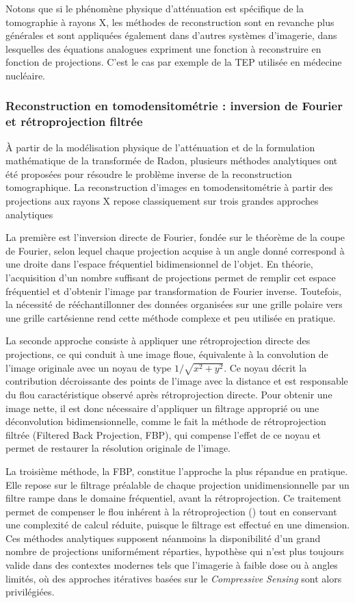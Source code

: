 Notons que si le phénomène physique d'atténuation est spécifique de la tomographie à rayons X, les méthodes de reconstruction sont en revanche plus générales et sont appliquées également dans d'autres systèmes d'imagerie, dans lesquelles des équations analogues expriment une fonction à reconstruire en fonction de projections. C'est le cas par exemple de la TEP utilisée en médecine nucléaire.

\subsubsection{Reconstruction en tomodensitométrie : inversion de Fourier et rétroprojection filtrée}
À partir de la modélisation physique de l'atténuation et de la formulation mathématique de la
transformée de Radon, plusieurs méthodes analytiques ont été proposées pour résoudre le
problème inverse de la reconstruction tomographique.
La reconstruction d'images en tomodensitométrie à partir des projections aux rayons X repose
classiquement sur trois grandes approches analytiques 

La première est l'inversion directe de Fourier, fondée sur le théorème de la coupe de Fourier, selon lequel chaque projection acquise à
un angle donné correspond à une droite dans l'espace fréquentiel bidimensionnel de l'objet.
En théorie, l'acquisition d'un nombre suffisant de projections permet de remplir cet espace
fréquentiel et d'obtenir l'image par transformation de Fourier inverse. Toutefois, la nécessité
de rééchantillonner des données organisées sur une grille polaire vers une grille cartésienne
rend cette méthode complexe et peu utilisée en pratique. 

La seconde approche consiste à appliquer une rétroprojection directe des projections, ce qui conduit à une image floue,
équivalente à la convolution de l'image originale avec un noyau de type
$1/\sqrt{x^2+y^2}$. Ce noyau décrit la contribution décroissante des points de l'image avec la distance et est responsable du flou caractéristique observé après rétroprojection directe. Pour obtenir une image nette, il est donc nécessaire d'appliquer un filtrage approprié ou une déconvolution bidimensionnelle, comme le fait la méthode de rétroprojection filtrée (Filtered Back Projection, FBP), qui compense l'effet de ce noyau et permet de restaurer la résolution originale de l'image. 

La troisième méthode, la FBP, constitue l'approche la plus répandue en pratique. Elle repose sur le
filtrage préalable de chaque projection unidimensionnelle par un filtre rampe dans le domaine
fréquentiel, avant la rétroprojection. Ce traitement permet de compenser le flou inhérent à la
rétroprojection (\cite{9}) tout en conservant une complexité de calcul réduite, puisque le filtrage est
effectué en une dimension. Ces méthodes analytiques supposent néanmoins la disponibilité d'un
grand nombre de projections uniformément réparties, hypothèse qui n'est plus toujours valide
dans des contextes modernes tels que l'imagerie à faible dose ou à angles limités, où des
approches itératives basées sur le \emph{Compressive Sensing} sont alors privilégiées.


